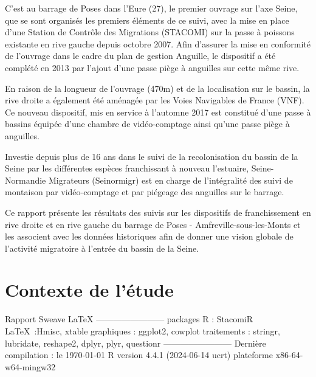 \documentclass[11pt,titlepage,twoside]{report}\usepackage[]{graphicx}\usepackage[table]{xcolor}
\def\\{}%
\begin{document}
C'est au barrage de Poses dans l'Eure (27), le premier ouvrage sur l'axe Seine, que se sont organisés les premiers éléments de ce suivi, avec la mise en place d'une Station de Contrôle des Migrations (STACOMI) sur la passe à poissons existante en rive gauche depuis octobre 2007. Afin d'assurer la mise en conformité de l'ouvrage dans le cadre du plan de gestion Anguille, le dispositif a été complété en 2013 par l'ajout d'une passe piège à anguilles sur cette même rive.

En raison de la longueur de l'ouvrage (470m) et de la localisation sur le bassin, la rive droite a également été aménagée par les Voies Navigables de France (VNF). Ce nouveau dispositif, mis en service à l'automne 2017 est constitué d'une passe à bassins équipée d'une chambre de vidéo-comptage ainsi qu'une passe piège à anguilles.

Investie depuis plus de 16 ans dans le suivi de la recolonisation du bassin de la Seine par les différentes espèces franchissant à nouveau l'estuaire, Seine-Normandie Migrateurs (Seinormigr) est en charge de l'intégralité des suivi de montaison par vidéo-comptage et par piégeage des anguilles sur le barrage.

Ce rapport présente les résultats des suivis sur les dispositifs de franchissement en rive droite et en rive gauche du barrage de Poses - Amfreville-sous-les-Monts et les associent avec les données historiques afin de donner une vision globale de l'activité migratoire à l'entrée du bassin de la Seine.

\clearpage

\section{Contexte de l'étude}

\clearpage


\normalsize
\null
\vfill

Rapport Sweave \LaTeX \\
------------------------\\
packages R : \vspace{1mm}
StacomiR \citep{legrand_stacomir_2019}\\
\LaTeX \ :Hmisc, xtable\\
graphiques : ggplot2, cowplot\\
traitements : stringr, lubridate, reshape2, dplyr, plyr, questionr\\
------------------------\\
Dernière compilation : le \today \\
 R version 4.4.1 (2024-06-14 ucrt)\\
 plateforme x86-64-w64-mingw32

\clearpage
\end{document}
